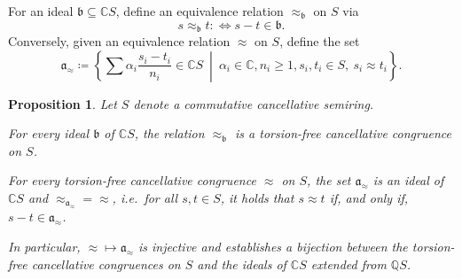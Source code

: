 \documentclass[11pt]{scrartcl}
\theoremstyle{definition}
\theoremstyle{plain}
\newtheorem{proposition}[definition]{Proposition}
\theoremstyle{remark}
\newcommand{\defiff}{:\!\!\iff}
\begin{document}
	For an ideal $\mathfrak{b} \subseteq \mathbb{C}S$,
	define an equivalence relation $\approx_{\mathfrak{b}}$ on $S$ via
	\[
		s \approx_{\mathfrak{b}} t \defiff s - t \in \mathfrak{b}.
	\]
	Conversely, given an equivalence relation $\approx$ on $S$,
	define the set
	\begin{equation}\label{eq:a-approx-complex}
		\mathfrak{a}_{\approx} \coloneqq \left\{\sum \alpha_i \frac{s_i - t_i}{n_i} \in \mathbb{C}S \ \middle|\ \alpha_i \in \mathbb{C}, n_i\geq 1, s_i, t_i
		 \in S, \ s_i \approx t_i \right\}.
	\end{equation}
	
	\begin{proposition}\label{prop:ideals-to-relations-complex}
		Let $S$ denote a commutative cancellative semiring.
		\begin{assertions}
			\item\label{it:complex-ideal-to-relation}
			For every ideal $\mathfrak{b}$ of $\mathbb{C}S$,
			the relation $\approx_{\mathfrak{b}}$ is a torsion-free cancellative congruence on $S$.
			\item\label{it:complex-relation-to-ideal}
			For every torsion-free cancellative congruence $\approx$ on $S$,
			the set $\mathfrak{a}_{\approx}$ is an ideal of $\mathbb{C}S$
			and ${\approx_{\mathfrak{a}_{\approx}}} = {\approx}$,
			i.e.\ for all $s,t \in S$, it holds that $s \approx t$ if, and only if, $s - t \in \mathfrak{a}_{\approx}$.
		\end{assertions}
		In particular, ${\approx} \mapsto \mathfrak{a}_{\approx}$ is injective
		and establishes a bijection between the torsion-free cancellative congruences on $S$
		and the ideals of $\mathbb{C}S$ extended from $\mathbb{Q}S$.
	\end{proposition}
\end{document}
